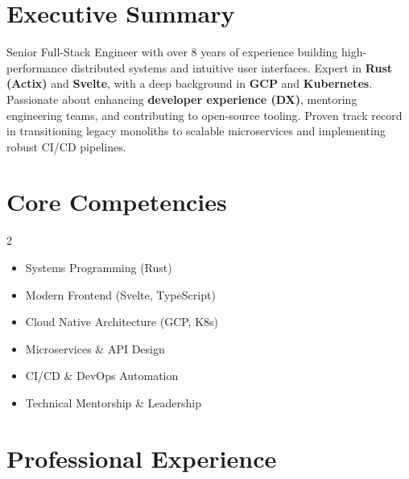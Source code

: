 \documentclass[11pt,letterpaper]{article}
\begin{document}
    \section{Executive Summary}
    \begin{infocard}[colback=white, drop shadow={opacity=0.15}]
        \color{textcolor}
        Senior Full-Stack Engineer with over 8 years of experience building high-performance distributed systems and intuitive user interfaces. Expert in \textbf{Rust (Actix)} and \textbf{Svelte}, with a deep background in \textbf{GCP} and \textbf{Kubernetes}. Passionate about enhancing \textbf{developer experience (DX)}, mentoring engineering teams, and contributing to open-source tooling. Proven track record in transitioning legacy monoliths to scalable microservices and implementing robust CI/CD pipelines.
    \end{infocard}



    \section{Core Competencies}
    \begin{multicols}{2}
    \begin{itemize}[itemsep=2pt, parsep=1pt]
    
        \item Systems Programming (Rust)
    
        \item Modern Frontend (Svelte, TypeScript)
    
        \item Cloud Native Architecture (GCP, K8s)
    
        \item Microservices \& API Design
    
        \item CI/CD \& DevOps Automation
    
        \item Technical Mentorship \& Leadership
    
    \end{itemize}
    \end{multicols}



    \section{Professional Experience}
\end{document}
